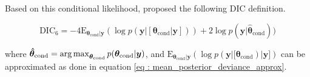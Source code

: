 Based on this conditional likelihood, \citet{celeux_deviance_2006} proposed the following DIC definition.

\begin{equation}
\label{eq : DIC6}
\text{DIC}_6 = -4\text{E}_{\boldsymbol{\theta}_\text{cond}|\boldsymbol{y}} (\log{p(\boldsymbol{y}|[\boldsymbol{\theta}_{\text{cond}}|\boldsymbol{y}])}) + 2\log{p(\boldsymbol{y}|\boldsymbol{\hat{\theta}}_\text{cond})})
\end{equation}

where
$\boldsymbol{\hat{\theta}}_\text{cond} = \operatorname*{arg\,max}_{\boldsymbol{\theta}_\text{cond}}p(\boldsymbol{\theta}_\text{cond}|\boldsymbol{y})$, and $\text{E}_{\boldsymbol{\theta}_\text{cond}|\boldsymbol{y}} (\log{p(\boldsymbol{y}|[\boldsymbol{\theta}_{\text{cond}})}|\boldsymbol{y}])$ can be approximated as done in equation \ref{eq : mean_posterior_deviance_approx}.